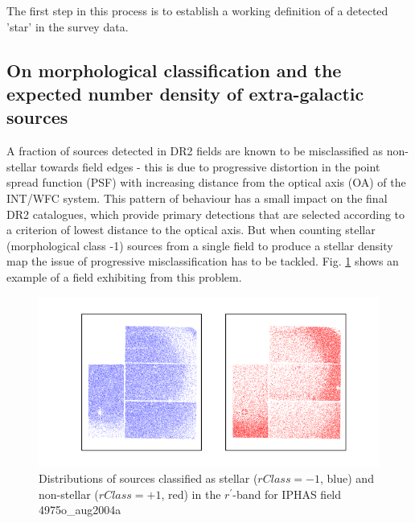 \documentclass[a4paper,useAMS,usenatbib]{mn2e}
\begin{document}
The first step in this process is to establish a working definition of a detected 'star' in the survey data.


\subsection{On morphological classification and the expected number density of extra-galactic sources}
\label{subsec:galaxy_density}

A fraction of sources detected in DR2 fields are known to be misclassified as 
non-stellar towards field edges - this is due to progressive distortion in the point spread function (PSF) with increasing 
distance from the optical axis (OA) of the INT/WFC system. This pattern of behaviour has a small impact on the final DR2 
catalogues, which provide primary detections that are selected according to a criterion of lowest distance to the optical 
axis.  But when counting stellar (morphological class -1) sources from a single field to produce a stellar density map 
the issue of progressive misclassification has to be tackled. Fig. \ref{fig:misclassification} 
shows an example of a field exhibiting from this problem.

\begin{figure}
\begin{center}
\includegraphics[width=1\linewidth]{figures/morphology_misclassification.png} 
\caption{\footnotesize{Distributions of sources classified as stellar ($rClass=-1$, blue) 
and non-stellar ($rClass=+1$, red) in the $r^{\prime}$-band for IPHAS field 4975o\_aug2004a} }
\label{fig:misclassification}
\end{center}
\end{figure}
\end{document}
